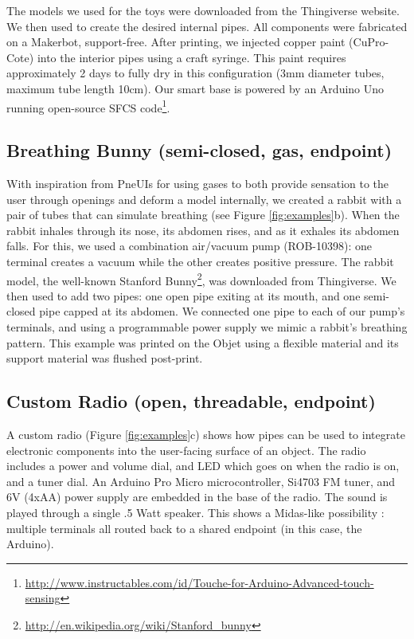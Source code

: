 The models we used for the toys were downloaded from the  Thingiverse website.  We then used \systemname to create the desired internal pipes. All components were fabricated on a Makerbot, support-free.  After printing, we injected copper paint (CuPro-Cote) into the interior pipes using a craft syringe.  This paint requires approximately 2 days to fully dry in this configuration (3mm diameter tubes, maximum tube length 10cm).  Our smart base is powered by an Arduino Uno running open-source SFCS code\footnote{\url{http://www.instructables.com/id/Touche-for-Arduino-Advanced-touch-sensing}}. 

\subsection{Breathing Bunny (semi-closed, gas, endpoint)}

With inspiration from PneUIs \cite{Yao-pneui} for using gases to both provide sensation to the user through openings and deform a model internally, we created a rabbit with a pair of tubes that can simulate breathing (see Figure \ref{fig:examples}b).  When the rabbit inhales through its nose, its abdomen rises, and as it exhales its abdomen falls.  For this, we used a combination air/vacuum pump (ROB-10398): one terminal creates a vacuum while the other creates positive pressure.  
The rabbit model, the well-known Stanford Bunny\footnote{\url{http://en.wikipedia.org/wiki/Stanford_bunny}}, was downloaded from Thingiverse. We then used \systemname to add two pipes: one open pipe exiting at its mouth, and one semi-closed pipe capped at its abdomen.  We connected one pipe to each of our pump's terminals, and using a programmable power supply we mimic a rabbit's breathing pattern.  This example was printed on the Objet using a flexible material and its support material was flushed post-print.

\subsection{Custom Radio (open, threadable, endpoint)}
A custom radio (Figure \ref{fig:examples}c) shows how pipes can be used to integrate electronic components into the user-facing surface of an object. The radio includes a power and volume dial, and LED which goes on when the radio is on, and a tuner dial. An Arduino Pro Micro microcontroller, Si4703 FM tuner, and 6V (4xAA) power supply are embedded in the base of the radio. The sound is played through a single .5 Watt speaker. This shows a Midas-like \cite{Savage-midas} possibility : multiple terminals all routed back to a shared endpoint (in this case, the Arduino). 

